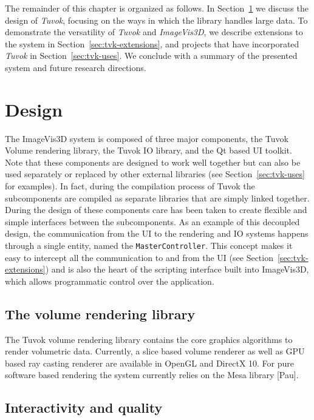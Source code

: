 The remainder of this chapter is organized as follows. In
Section~\ref{sec:tvk-design} we discuss the design of \textit{Tuvok},
focusing on the ways in which the library handles large data. To
demonstrate
the versatility of \textit{Tuvok} and \textit{ImageVis3D}, we describe
extensions
to the system in Section~\ref{sec:tvk-extensions}, and projects that
have
incorporated \textit{Tuvok} in Section~\ref{sec:tvk-uses}. We conclude
with a summary of the presented system and future research directions.

\section{Design}
\label{sec:tvk-design}

The ImageVis3D system is composed of three major
components, the Tuvok Volume rendering library, the Tuvok IO
library, and the Qt based UI toolkit. Note that these
components are designed to work well together but can also be
used separately or replaced by other external libraries (see
Section~\ref{sec:tvk-uses} for examples). In fact, during the
compilation process of Tuvok the subcomponents are compiled as separate
libraries that are simply linked together. During the design of these
components care has been taken to create flexible and simple interfaces
between the subcomponents. As an example of this decoupled design,
the communication from the UI to the rendering and IO systems happens
through a single entity, named the \texttt{MasterController}. This concept makes
it easy to intercept all the communication to and from the
UI (see Section~\ref{sec:tvk-extensions}) and is also the heart of the
scripting interface built into ImageVis3D, which allows programmatic
control over the application.

\subsection{The volume rendering library}

The Tuvok volume rendering library contains the core graphics
algorithms to render volumetric data. Currently, a slice
based volume renderer as well as GPU based ray casting
renderer are available in OpenGL and DirectX 10. For pure
software based rendering the system currently relies on the
Mesa library [Pau].

\subsection{Interactivity and quality}

